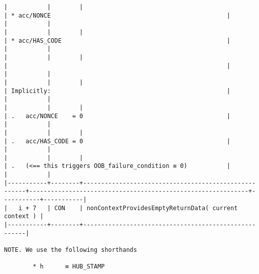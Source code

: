 \documentclass[varwidth=\maxdimen,margin=0.5cm,multi={verbatim}]{standalone}
\begin{document}
\begin{verbatim}
|           |        |                                                      | * acc/NONCE                                                 |           |           |
|           |        |                                                      | * acc/HAS_CODE                                              |           |           |
|           |        |                                                      |                                                             |           |           |
|           |        |                                                      | Implicitly:                                                 |           |           |
|           |        |                                                      | .   acc/NONCE    = 0                                        |           |           |
|           |        |                                                      | .   acc/HAS_CODE = 0                                        |           |           |
|           |        |                                                      | .   (<== this triggers OOB_failure_condition ≡ 0)           |           |           |
|-----------+--------+------------------------------------------------------+-------------------------------------------------------------+-----------+-----------|
|   i + 7   | CON    | nonContextProvidesEmptyReturnData( current context ) |
|-----------+--------+------------------------------------------------------|

NOTE. We use the following shorthands

        * h      ≡ HUB_STAMP

\end{verbatim}
\end{document}
